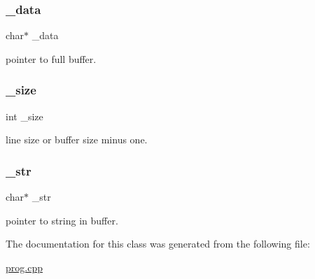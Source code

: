 \mbox{\label{classmessage_a6d995411bcb21f78e2b123e9449df39c}} 
\subsubsection{\texorpdfstring{\+\_\+data}{\_data}}
{\footnotesize\ttfamily char$\ast$ \+\_\+data}



pointer to full buffer. 

\mbox{\label{classmessage_aaa6c8c862a2c0bc18c802314cc58961d}} 
\subsubsection{\texorpdfstring{\+\_\+size}{\_size}}
{\footnotesize\ttfamily int \+\_\+size}



line size or buffer size minus one. 

\mbox{\label{classmessage_a2606729876d9435e492e52b9ffca7968}} 
\subsubsection{\texorpdfstring{\+\_\+str}{\_str}}
{\footnotesize\ttfamily char$\ast$ \+\_\+str}



pointer to string in buffer. 



The documentation for this class was generated from the following file\+:\begin{DoxyCompactItemize}
\item 
\hyperlink{prog_8cpp}{prog.\+cpp}\end{DoxyCompactItemize}
